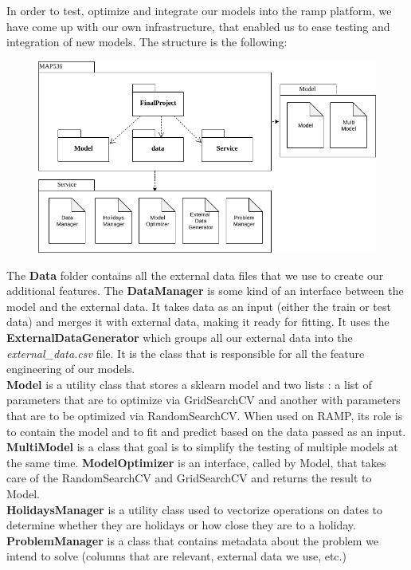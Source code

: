 \documentclass[a4paper,12pt,twoside]{article}
\begin{document}
In order to test, optimize and integrate our models into the ramp platform, we have come up with our own infrastructure, that enabled us to ease testing and integration of new models. The structure is the following:
\begin{figure}[H]
	\centering
	\includegraphics[scale=0.5]{UML.png}
\end{figure}
The \textbf{Data} folder contains all the external data files that we use to create our additional features. The \textbf{DataManager} is some kind of an interface between the model and the external data. It takes data as an input (either the train or test data) and merges it with external data, making it ready for fitting. It uses the \textbf{ExternalDataGenerator} which groups all our external data into the \textit{external\_data.csv} file. It is the class that is responsible for all the feature engineering of our models.\\
\textbf{Model} is a utility class that stores a sklearn model and two lists : a list of parameters that are to optimize via GridSearchCV and another with parameters that are to be optimized via RandomSearchCV. When used on RAMP, its role is to contain the model and to fit and predict based on the data passed as an input. \textbf{MultiModel} is a class that goal is to simplify the testing of multiple models at the same time. \textbf{ModelOptimizer} is an interface, called by Model, that takes care of the RandomSearchCV and GridSearchCV and returns the result to Model.\\
\textbf{HolidaysManager} is a utility class used to vectorize operations on dates to determine whether they are holidays or how close they are to a holiday. \textbf{ProblemManager} is a class that contains metadata about the problem we intend to solve (columns that are relevant, external data we use, etc.)
\end{document}

